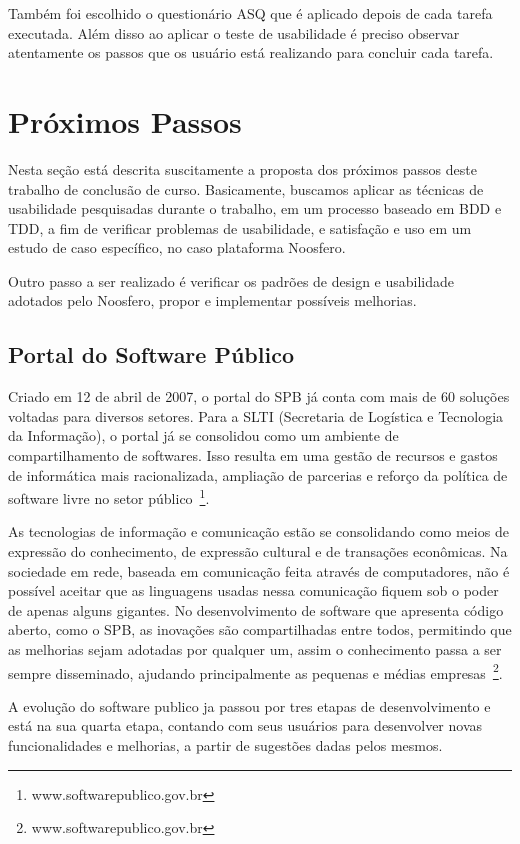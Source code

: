 	Também foi escolhido o questionário ASQ que é aplicado depois de cada tarefa executada. Além disso ao aplicar o teste de usabilidade é preciso observar atentamente os passos que os usuário está realizando para concluir cada tarefa.


\section{Próximos Passos}

Nesta seção está descrita suscitamente a proposta dos próximos passos deste trabalho de conclusão de curso. Basicamente, buscamos aplicar as técnicas de usabilidade pesquisadas durante o trabalho, em um processo baseado em BDD e TDD, a fim de verificar problemas de usabilidade, e satisfação e uso em um estudo de caso específico, no caso plataforma Noosfero. 

Outro passo a ser realizado é verificar os padrões de design e usabilidade adotados pelo Noosfero, propor  e implementar possíveis melhorias.

\subsection{Portal do Software Público}

Criado em 12 de abril de 2007, o portal do SPB já conta com mais de 60 soluções voltadas para diversos setores. Para a SLTI (Secretaria de Logística e Tecnologia da Informação), o portal já se consolidou como um ambiente de compartilhamento de softwares. Isso resulta em uma gestão de recursos e gastos de informática mais racionalizada, ampliação de parcerias e reforço da política de software livre no setor público~\footnote{www.softwarepublico.gov.br}. 

As tecnologias de informação e comunicação estão se consolidando como meios de expressão do conhecimento, de expressão cultural e de transações econômicas. Na sociedade em rede, baseada em comunicação feita através de computadores, não é possível aceitar que as linguagens usadas nessa comunicação fiquem sob o poder de apenas alguns gigantes. No desenvolvimento de software que apresenta código aberto, como o SPB, as inovações são compartilhadas entre todos, permitindo que as melhorias sejam adotadas por qualquer um, assim o conhecimento passa a ser sempre disseminado, ajudando principalmente as pequenas e médias empresas~\footnote{www.softwarepublico.gov.br}.

A evolução do software publico ja passou por tres etapas de desenvolvimento e está na sua quarta etapa, contando com seus usuários para desenvolver novas funcionalidades e melhorias, a partir de sugestões dadas pelos mesmos.

